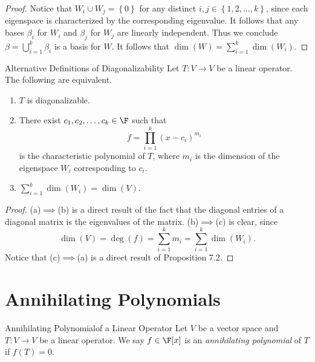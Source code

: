 \documentclass[linearalgebra]{subfiles}
\begin{document}
    \begin{proof}
        Notice that $W_i\cup W_j = \left\lbrace 0 \right\rbrace$ for any distinct $i,j\in \left\lbrace 1, 2, \ldots, k \right\rbrace$, since each eigenspace is characterized by the corresponding eigenvalue. It follows that any bases $\beta_i$ for $W_i$ and $\beta_j$ for $W_j$ are linearly independent. Thus we conclude $\beta=\bigcup^{k}_{i=1} \beta_i$ is a basis for $W$. It follows that $\dim \left( W \right) = \sum^{k}_{i=1} \dim(W_i)$. 
    \end{proof}

    \begin{prop}{Alternative Definitions of Diagonalizability}
        Let $T:V\to V$ be a linear operator. The following are equivalent.
        \begin{enumerate}
            \item $T$ is diagonalizable.
            \item There exist $c_1, c_2, \ldots, c_k\in \F$ such that
                \begin{equation*}
                    f = \prod^{k}_{i=1} (x-c_i)^{m_i}
                \end{equation*}
                is the characteristic polynomial of $T$, where $m_i$ is the dimension of the eigenspace $W_i$ corresponding to $c_i$.
            \item $\sum^{k}_{i=1} \dim(W_i) = \dim(V)$.
        \end{enumerate}
    \end{prop}

    \begin{proof}
        (a)$\implies$(b) is a direct result of the fact that the diagonal entries of a diagonal matrix is the eigenvalues of the matrix. (b)$\implies$(c) is clear, since
        \begin{equation*}
            \dim(V) = \deg(f) = \sum^{k}_{i=1} m_i = \sum^{k}_{i=1} \dim(W_i).  
        \end{equation*}
        Notice that (c)$\implies$(a) is a direct result of Proposition 7.2. 
    \end{proof}

    \section{Annihilating Polynomials}

    \begin{definition}{Annihilating Polynomial}{of a Linear Operator}
        Let $V$ be a vector space and $T:V\to V$ be a linear operator. We say $f\in\F[x]$ is an \emph{annihilating polynomial} of $T$ if $f(T)=0$.
    \end{definition}
\end{document}
